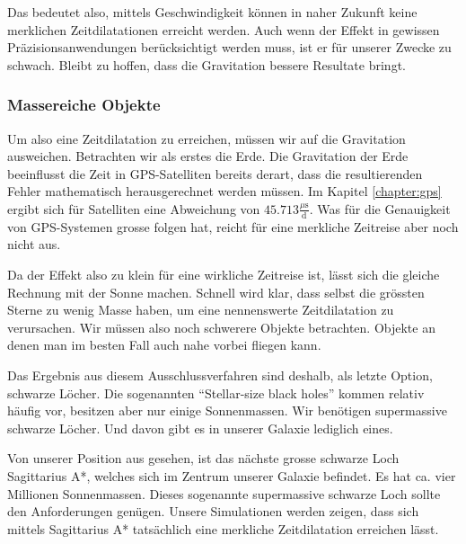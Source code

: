 \begin{refsection}
    Das bedeutet also, mittels Geschwindigkeit können in naher Zukunft keine merklichen Zeitdilatationen erreicht werden. Auch wenn der Effekt in gewissen Präzisionsanwendungen berücksichtigt werden muss, ist er für unserer Zwecke zu schwach. Bleibt zu hoffen, dass die Gravitation bessere Resultate bringt. 
    
    \subsubsection{Massereiche Objekte}
    Um also eine Zeitdilatation zu erreichen, müssen wir auf die Gravitation ausweichen. Betrachten wir als erstes die Erde. Die Gravitation der Erde beeinflusst die Zeit in GPS-Satelliten bereits derart, dass die resultierenden Fehler mathematisch herausgerechnet werden müssen. Im Kapitel \ref{chapter:gps} ergibt sich für Satelliten eine Abweichung von $45.713 \frac{\mu\text{s}}{\text{d}}$. Was für die Genauigkeit von GPS-Systemen grosse folgen hat, reicht für eine merkliche Zeitreise aber noch nicht aus.
    
    Da der Effekt also zu klein für eine wirkliche Zeitreise ist, lässt sich die gleiche Rechnung mit der Sonne machen. Schnell wird klar, dass selbst die grössten Sterne zu wenig Masse haben, um eine nennenswerte Zeitdilatation zu verursachen. Wir müssen also noch schwerere Objekte betrachten. Objekte an denen man im besten Fall auch nahe vorbei fliegen kann. 
     
    Das Ergebnis aus diesem Ausschlussverfahren sind deshalb, als letzte Option, schwarze Löcher. Die sogenannten ``Stellar-size black holes'' kommen relativ häufig vor, besitzen aber nur einige Sonnenmassen. Wir benötigen supermassive schwarze Löcher. Und davon gibt es in unserer Galaxie lediglich eines.
    
     Von unserer Position aus gesehen, ist das nächste grosse schwarze Loch Sagittarius A*, welches sich im Zentrum unserer Galaxie befindet. Es hat ca. vier Millionen Sonnenmassen. Dieses sogenannte supermassive schwarze Loch sollte den Anforderungen genügen. Unsere Simulationen werden zeigen, dass sich mittels Sagittarius A* tatsächlich eine merkliche Zeitdilatation erreichen lässt.
%
    

\end{refsection}
